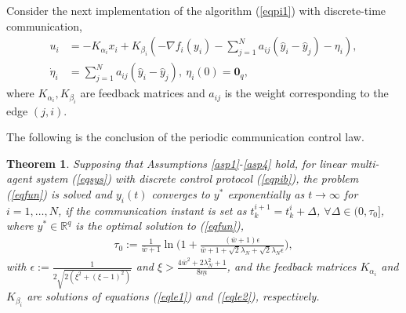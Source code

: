 \documentclass[final,5p,times,twocolumn,authoryear]{elsarticle}
\newtheorem{theorem}{ {Theorem}}
\begin{document}
Consider the next implementation of the algorithm (\ref{eqpi1}) with discrete-time communication,
\begin{subequations}\label{eqpib}
	\begin{align}
		u_i&=-K_{\alpha_i}x_i+K_{\beta_i}(-\nabla f_i(y_i)-\sum_{j=1}^N a_{ij}(\hat y_i-\hat y_j)-\eta_i),\label{eqpiba}\\
		\dot\eta_i&=\sum_{j=1}^N a_{ij}(\hat y_i-\hat y_j),\ \eta_i(0)=\boldsymbol 0_q,\label{eqpibb}
	\end{align}
\end{subequations}
where $K_{\alpha_i},K_{\beta_i}$ are feedback matrices and $a_{ij}$ is the weight corresponding to the edge $(j,i)$.


The following is the conclusion of the periodic communication control law.

\begin{theorem}\label{th2}
	Supposing that Assumptions \ref{asp1}-\ref{asp4} hold, for linear multi-agent system (\ref{eqsys}) with discrete control protocol (\ref{eqpib}), the problem (\ref{eqfun}) is solved and $y_i(t)$ converges to $y^*$ exponentially as $t\to\infty$ for $i=1,\dots,N$, if the communication instant is set as $t_k^{i+1}=t_k^i+ \Delta$, $\forall\Delta \in (0, \tau_0]$, where $y^*\in\mathbb{R}^q$ is the optimal solution to (\ref{eqfun}),
	\begin{align}
		\tau_0:=\frac{1}{\overline{w}+1} \ln{\bigg(1+ \frac{(\overline{w}+1)\epsilon} {\overline{w}+1+\sqrt{2}\lambda_N+\sqrt{2}\lambda_N\epsilon}\bigg)},\label{tau1}
	\end{align}
	with $\epsilon:=\frac{1}{2\sqrt{2(\xi^2+(\xi-1)^2)}}$ and $\xi>\frac{4\overline{w}^2+2\lambda_N^2+1}{8\underline m}$, and the feedback matrices $K_{\alpha_i}$ and $K_{\beta_i}$ are solutions of equations (\ref{eqle1}) and (\ref{eqle2}), respectively.
\end{theorem}
\end{document}
